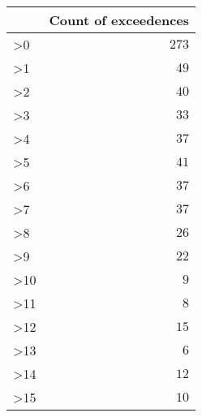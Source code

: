 \begin{table}[!tbp]
\begin{center}
\begin{tabular}{lr}
\hline\hline
\multicolumn{1}{l}{}&\multicolumn{1}{c}{Count of exceedences}\tabularnewline
\hline
\textgreater0&$273$\tabularnewline
\textgreater1&$ 49$\tabularnewline
\textgreater2&$ 40$\tabularnewline
\textgreater3&$ 33$\tabularnewline
\textgreater4&$ 37$\tabularnewline
\textgreater5&$ 41$\tabularnewline
\textgreater6&$ 37$\tabularnewline
\textgreater7&$ 37$\tabularnewline
\textgreater8&$ 26$\tabularnewline
\textgreater9&$ 22$\tabularnewline
\textgreater10&$  9$\tabularnewline
\textgreater11&$  8$\tabularnewline
\textgreater12&$ 15$\tabularnewline
\textgreater13&$  6$\tabularnewline
\textgreater14&$ 12$\tabularnewline
\textgreater15&$ 10$\tabularnewline
\hline
\end{tabular}\end{center}

\end{table}
